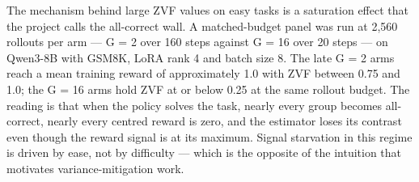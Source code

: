 \documentclass[12pt,a4paper]{report}
\begin{document}
The mechanism behind large ZVF values on easy tasks is a saturation
effect that the project calls the all-correct wall. A matched-budget
panel was run at 2,560 rollouts per arm --- G = 2 over 160 steps against
G = 16 over 20 steps --- on Qwen3-8B with GSM8K, LoRA rank 4 and batch
size 8. The late G = 2 arms reach a mean training reward of
approximately 1.0 with ZVF between 0.75 and 1.0; the G = 16 arms hold
ZVF at or below 0.25 at the same rollout budget. The reading is that
when the policy solves the task, nearly every group becomes all-correct,
nearly every centred reward is zero, and the estimator loses its
contrast even though the reward signal is at its maximum. Signal
starvation in this regime is driven by ease, not by difficulty --- which
is the opposite of the intuition that motivates variance-mitigation
work.
\end{document}
